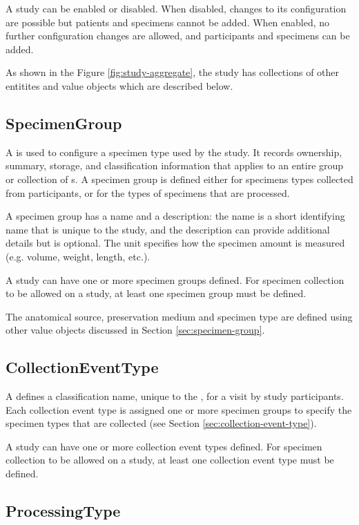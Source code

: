 A study can be enabled or disabled. When disabled, changes to its configuration
are possible but patients and specimens cannot be added. When enabled, no
further configuration changes are allowed, and participants and specimens can
be added.

As shown in the Figure \ref{fig:study-aggregate}, the study has collections of
other entitites and value objects which are described below.

\subsection*{SpecimenGroup}

A  is used to configure a specimen type used by the
study.  It records ownership, summary, storage, and classification information
that applies to an entire group or collection of s. A
specimen group is defined either for specimens types collected from
participants, or for the types of specimens that are processed.

A specimen group has a name and a description: the name is a short identifying
name that is unique to the study, and the description can provide additional
details but is optional. The unit specifies how the specimen amount is measured
(e.g. volume, weight, length, etc.).

A study can have one or more specimen groups defined.  For specimen collection
to be allowed on a study, at least one specimen group must be defined.

The anatomical source, preservation medium and specimen type are defined using
other value objects discussed in Section \ref{sec:specimen-group}.

\subsection*{CollectionEventType}

A  defines a classification name, unique to
the , for a visit by study participants. Each collection
event type is assigned one or more specimen groups to specify the specimen
types that are collected (see Section \ref{sec:collection-event-type}).

A study can have one or more collection event types defined. For specimen
collection to be allowed on a study, at least one collection event type must be
defined.

\subsection*{ProcessingType}

